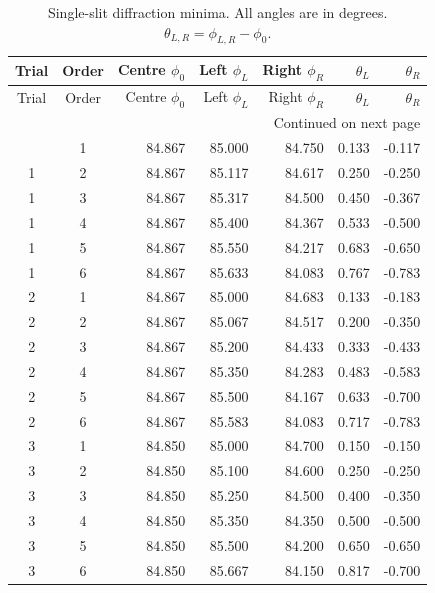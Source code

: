\documentclass[12pt,letterpaper]{article}
\begin{document}
\begingroup
\small
\setlength{\tabcolsep}{5pt}
\renewcommand{\arraystretch}{1.15}
\begin{longtable}{ccrrrrr}
\caption{Single-slit diffraction minima. All angles are in degrees. $\theta_{L,R}=\phi_{L,R}-\phi_0$.}\label{tab:diffraction-1}\\
\toprule
Trial & Order & Centre $\phi_0$ & Left $\phi_L$ & Right $\phi_R$ & $\theta_L$ & $\theta_R$ \\
\midrule
\endfirsthead
\toprule
Trial & Order & Centre $\phi_0$ & Left $\phi_L$ & Right $\phi_R$ & $\theta_L$ & $\theta_R$ \\
\midrule
\endhead
\midrule
\multicolumn{7}{r}{Continued on next page} \\
\endfoot
\bottomrule
\endlastfoot
1 & 1 & 84.867 & 85.000 & 84.750 & 0.133 & -0.117 \\
1 & 2 & 84.867 & 85.117 & 84.617 & 0.250 & -0.250 \\
1 & 3 & 84.867 & 85.317 & 84.500 & 0.450 & -0.367 \\
1 & 4 & 84.867 & 85.400 & 84.367 & 0.533 & -0.500 \\
1 & 5 & 84.867 & 85.550 & 84.217 & 0.683 & -0.650 \\
1 & 6 & 84.867 & 85.633 & 84.083 & 0.767 & -0.783 \\
\midrule
2 & 1 & 84.867 & 85.000 & 84.683 & 0.133 & -0.183 \\
2 & 2 & 84.867 & 85.067 & 84.517 & 0.200 & -0.350 \\
2 & 3 & 84.867 & 85.200 & 84.433 & 0.333 & -0.433 \\
2 & 4 & 84.867 & 85.350 & 84.283 & 0.483 & -0.583 \\
2 & 5 & 84.867 & 85.500 & 84.167 & 0.633 & -0.700 \\
2 & 6 & 84.867 & 85.583 & 84.083 & 0.717 & -0.783 \\
\midrule
3 & 1 & 84.850 & 85.000 & 84.700 & 0.150 & -0.150 \\
3 & 2 & 84.850 & 85.100 & 84.600 & 0.250 & -0.250 \\
3 & 3 & 84.850 & 85.250 & 84.500 & 0.400 & -0.350 \\
3 & 4 & 84.850 & 85.350 & 84.350 & 0.500 & -0.500 \\
3 & 5 & 84.850 & 85.500 & 84.200 & 0.650 & -0.650 \\
3 & 6 & 84.850 & 85.667 & 84.150 & 0.817 & -0.700 \\
\end{longtable}
\end{document}
